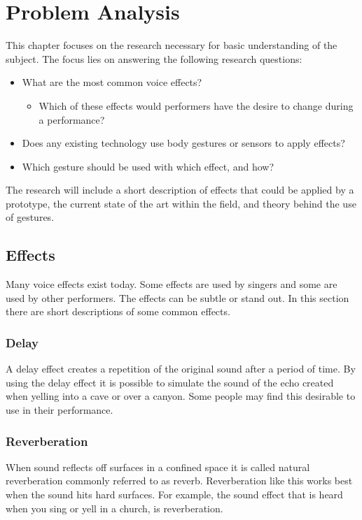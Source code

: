\chapter{Problem Analysis}
This chapter focuses on the research necessary for basic understanding of the subject. The focus lies on answering the following research questions:

\begin{itemize}
	\item What are the most common voice effects?
	\begin{itemize}
		\item Which of these effects would performers have the desire to change during a performance?
	\end{itemize}
	\item Does any existing technology use body gestures or sensors to apply effects?
	\item Which gesture should be used with which effect, and how?
\end{itemize}

The research will include a short description of effects that could be applied by a prototype, the current state of the art within the field, and theory behind the use of gestures.

\section{Effects}
Many voice effects exist today. Some effects are used by singers and some are used by other performers. The effects can be subtle or stand out. In this section there are short descriptions of some common effects.


\subsection{Delay}

A delay effect creates a repetition of the original sound after a period of time\citep{Loeffler_2014}. By using the delay effect it is possible to simulate the sound of the echo created when yelling into a cave or over a canyon. Some people may find this desirable to use in their performance. 

\subsection{Reverberation}

When sound reflects off surfaces in a confined space it is called natural reverberation\citep{Redmon_1997} commonly referred to as reverb. Reverberation like this works best when the sound hits hard surfaces. For example, the sound effect that is heard when you sing or yell in a church, is reverberation. 

